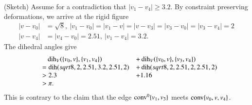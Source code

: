 \begin{tarskidata}
\begin{tarski}
\begin{proved} (Sketch) Assume for a contradiction that $|v_1-v_4|\ge 3.2$.
By
constraint preserving deformations, we arrive at the rigid figure
    $$
    \begin{array}{lll}
    |v-v_0|&=\sqrt{8},\ |v_1-v_0|=|v_1-v|=|v-v_3|=|v_3-v_0|=|v_3-v_4|=2
    \\ |v-v_4|&=|v_4-v_0|=2.51,\ |v_1-v_4|=3.2.
    \end{array}
    $$
The dihedral angles give
    $$
    \begin{array}{rll}
    &\phantom{=}\operatorname{dih}_V(\{v_0,v\},\{v_1,v_4\}) &+ \operatorname{dih}_V(\{v_0,v\},\{v_3,v_4\})\\
    &= \operatorname{dih}(sqrt{8},2,2.51,3.2,2.51,2) &+
    \operatorname{dih}(sqrt{8},2,2.51,2,2.51,2)\\
    &> 2.3 &+ 1.16 \\
    &>\pi .
    \end{array}
    $$
This is contrary to the claim that the edge
${\operatorname{conv}}^0\{v_1,v_3\}$ meets ${\operatorname{conv}}\{v_0,v,v_4\}$.
\swallowed\end{proved}
\end{tarski}














\end{tarskidata}
